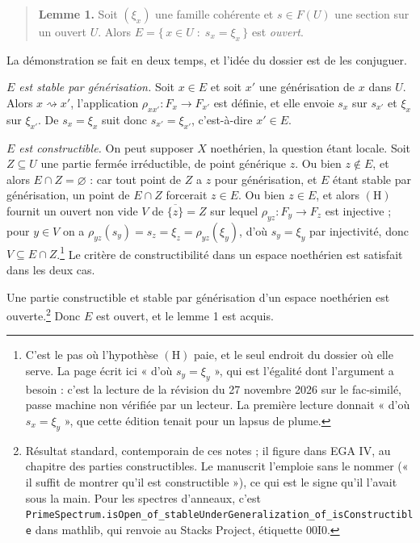 \documentclass[11pt,a4paper]{article}
\begin{document}
\begin{quote}
\textbf{Lemme 1.} Soit $(\xi_x)$ une famille cohérente et $s \in F(U)$ une
section sur un ouvert $U$. Alors
$E = \{\, x \in U \;:\; s_x = \xi_x \,\}$
est \emph{ouvert}.
\end{quote}

La démonstration se fait en deux temps, et l'idée du dossier est de les
conjuguer.

\emph{$E$ est stable par générisation.} Soit $x \in E$ et soit $x'$ une
générisation de $x$ dans $U$. Alors $x \rightsquigarrow x'$, l'application
$\rho_{x x'} : F_x \to F_{x'}$ est définie, et elle envoie $s_x$ sur $s_{x'}$
et $\xi_x$ sur $\xi_{x'}$. De $s_x = \xi_x$ suit donc $s_{x'} = \xi_{x'}$,
c'est-à-dire $x' \in E$.

\emph{$E$ est constructible.} On peut supposer $X$ noethérien, la question
étant locale. Soit $Z \subseteq U$ une partie fermée irréductible, de point
générique $z$. Ou bien $z \notin E$, et alors $E \cap Z = \varnothing$ : car
tout point de $Z$ a $z$ pour générisation, et $E$ étant stable par
générisation, un point de $E \cap Z$ forcerait $z \in E$. Ou bien $z \in E$,
et alors $(\mathrm{H})$ fournit un ouvert non vide $V$ de $\overline{\{z\}} =
Z$ sur lequel $\rho_{yz} : F_y \to F_z$ est injective ; pour $y \in V$ on a
$\rho_{yz}(s_y) = s_z = \xi_z = \rho_{yz}(\xi_y)$, d'où $s_y = \xi_y$ par
injectivité, donc $V \subseteq E \cap Z$.\footnote{C'est le pas où
l'hypothèse $(\mathrm{H})$ paie, et le seul endroit du dossier où elle serve.
La page écrit ici « d'où $s_y = \xi_y$ », qui est l'égalité dont l'argument a
besoin : c'est la lecture de la révision du 27 novembre 2026 sur le
fac-similé, passe machine non vérifiée par un lecteur. La première lecture
donnait « d'où $s_x = \xi_y$ », que cette édition tenait pour un lapsus de
plume.} Le critère de constructibilité dans un espace noethérien est
satisfait dans les deux cas.

Une partie constructible et stable par générisation d'un espace noethérien est
ouverte.\footnote{Résultat standard, contemporain de ces notes ; il figure
dans EGA IV, au chapitre des parties constructibles. Le manuscrit l'emploie
sans le nommer (« il suffit de montrer qu'il est constructible »), ce qui
est le signe qu'il l'avait sous la main. Pour les spectres d'anneaux, c'est
\texttt{PrimeSpectrum.isOpen\_of\_stableUnderGeneralization\_of\_isConstructible}
dans mathlib, qui renvoie au Stacks Project, étiquette 00I0.} Donc $E$ est
ouvert, et le lemme 1 est acquis.
\end{document}
